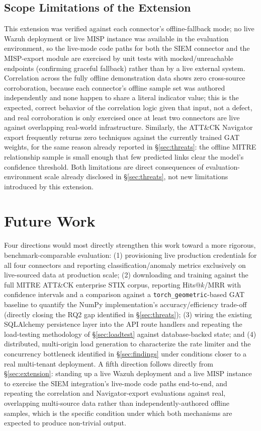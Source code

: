 \documentclass[conference]{IEEEtran}
\begin{document}
\subsection{Scope Limitations of the Extension}
This extension was verified against each connector's offline-fallback mode; no live Wazuh deployment or live MISP instance was available in the evaluation environment, so the live-mode code paths for both the SIEM connector and the MISP-export module are exercised by unit tests with mocked/unreachable endpoints (confirming graceful fallback) rather than by a live external system. Correlation across the fully offline demonstration data shows zero cross-source corroboration, because each connector's offline sample set was authored independently and none happen to share a literal indicator value; this is the expected, correct behavior of the correlation logic given that input, not a defect, and real corroboration is only exercised once at least two connectors are live against overlapping real-world infrastructure. Similarly, the ATT\&CK Navigator export frequently returns zero techniques against the currently trained GAT weights, for the same reason already reported in \S\ref{sec:threats}: the offline MITRE relationship sample is small enough that few predicted links clear the model's confidence threshold. Both limitations are direct consequences of evaluation-environment scale already disclosed in \S\ref{sec:threats}, not new limitations introduced by this extension.

\section{Future Work}
\label{sec:future}
Four directions would most directly strengthen this work toward a more rigorous, benchmark-comparable evaluation: (1) provisioning live production credentials for all four connectors and reporting classification/anomaly metrics exclusively on live-sourced data at production scale; (2) downloading and training against the full MITRE ATT\&CK enterprise STIX corpus, reporting Hits@$k$/MRR with confidence intervals and a comparison against a \texttt{torch\_geometric}-based GAT baseline to quantify the NumPy implementation's accuracy/efficiency trade-off (directly closing the RQ2 gap identified in \S\ref{sec:threats}); (3) wiring the existing SQLAlchemy persistence layer into the API route handlers and repeating the load-testing methodology of \S\ref{sec:loadtest} against database-backed state; and (4) distributed, multi-origin load generation to characterize the rate limiter and the concurrency bottleneck identified in \S\ref{sec:findings} under conditions closer to a real multi-tenant deployment. A fifth direction follows directly from \S\ref{sec:extension}: standing up a live Wazuh deployment and a live MISP instance to exercise the SIEM integration's live-mode code paths end-to-end, and repeating the correlation and Navigator-export evaluations against real, overlapping multi-source data rather than independently-authored offline samples, which is the specific condition under which both mechanisms are expected to produce non-trivial output.
\end{document}
